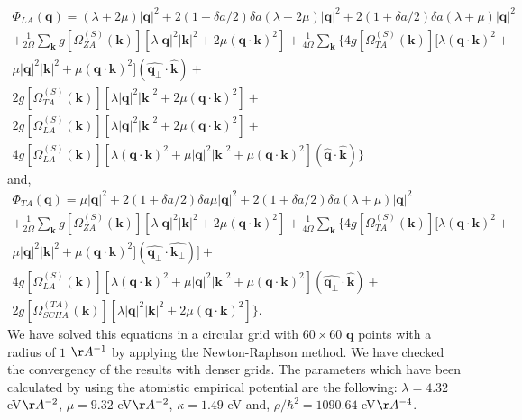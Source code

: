 \begin{multline}
 \Phi_{LA}(\boldsymbol{q})=(\lambda+2\mu)|\boldsymbol{q}|^{2}+2(1+\delta a/2)\delta a(\lambda+2\mu)|\boldsymbol{q}|^{2}+2(1+\delta a/2)\delta a(\lambda+\mu)|\boldsymbol{q}|^{2}\\+\frac{1}{2\Omega}\sum_{\boldsymbol{k}}g[\Omega_{ZA}^{(S)}(\boldsymbol{k})][\lambda|\boldsymbol{q}|^{2}|\boldsymbol{k}|^{2}+2\mu(\boldsymbol{q}\cdot\boldsymbol{k})^{2}]+\frac{1}{4\Omega}\sum_{\boldsymbol{k}}\{4g[\Omega_{TA}^{(S)}(\boldsymbol{k})][\lambda(\boldsymbol{q}\cdot\boldsymbol{
 k})^{2}+\\\mu|\boldsymbol{q}|^{2}|\boldsymbol{k}|^{2}+\mu(\boldsymbol{q}\cdot\boldsymbol{k})^{2}](\hat{\boldsymbol{q}_{\perp}}\cdot\hat{\boldsymbol{k}})+ \\ 2g[\Omega_{TA}^{(S)}(\boldsymbol{k})][\lambda|\boldsymbol{q}|^{2}|\boldsymbol{
 k}|^{2}+2\mu(\boldsymbol{q}\cdot\boldsymbol{k})^{2}]+ \\ 2g[\Omega_{LA}^{(S)}(\boldsymbol{k})][\lambda|\boldsymbol{q}|^{2}|\boldsymbol{k}|^{2}+2\mu(\boldsymbol{q}\cdot\boldsymbol{k})^{2}]+ \\ 4g[\Omega_{LA}^{(S)}(\boldsymbol{
 k})][\lambda(\boldsymbol{q}\cdot\boldsymbol{k})^{2}+\mu|\boldsymbol{q}|^{2}|\boldsymbol{k}|^{2}+\mu(\boldsymbol{q}\cdot\boldsymbol{k})^{2}](\hat{\boldsymbol{q}}\cdot\hat{\boldsymbol{k}})\}
\end{multline}
and,
\begin{multline}
 \Phi_{TA}(\boldsymbol{q})=\mu|\boldsymbol{q}|^{2}+2(1+\delta a/2)\delta a\mu|\boldsymbol{q}|^{2}+2(1+\delta a/2)\delta a(\lambda+\mu)|\boldsymbol{q}|^{2}\\+\frac{1}{2\Omega}\sum_{\boldsymbol{k}}g[\Omega_{ZA}^{(S)}(\boldsymbol{k})][\lambda|\boldsymbol{q}|^{2}|\boldsymbol{k}|^{2}+2\mu(\boldsymbol{q}\cdot\boldsymbol{k})^{2}]+\frac{1}{4\Omega}\sum_{\boldsymbol{k}}\{
 4g[\Omega_{TA}^{(S)}(\boldsymbol{k})][\lambda(\boldsymbol{q}\cdot\boldsymbol{k})^{2}+\\\mu|\boldsymbol{q}|^{2}|\boldsymbol{k}|^{2}+\mu(\boldsymbol{q}\cdot\boldsymbol{k})^{2}](\hat{\boldsymbol{q}_{\perp}}\cdot\hat{
 \boldsymbol{k}_{\perp}})]+\\4g[\Omega_{LA}^{(S)}(\boldsymbol{k})][\lambda(\boldsymbol{q}\cdot\boldsymbol{k})^{2}+\mu|\boldsymbol{q}|^{2}|\boldsymbol{k}|^{2}+\mu(\boldsymbol{q}\cdot\boldsymbol{k})^{2}](\hat{\boldsymbol{
 q}_{\perp}}\cdot\hat{\boldsymbol{k}})+ \\ 2g[\Omega_{SCHA}^{(TA)}(\boldsymbol{k})][\lambda|\boldsymbol{q}|^{2}|\boldsymbol{k}|^{2}+2\mu(\boldsymbol{q}\cdot\boldsymbol{k})^{2}]  \}.
\end{multline}
We have solved this equations in a circular grid with $60\times60$ $\boldsymbol{q}$ points with a radius of $1$ 
$\AA^{-1}$ by applying the Newton-Raphson method. We have checked the convergency of the results with denser grids. 
The parameters which have been calculated by using the atomistic empirical potential are the following: 
$\lambda=4.32$ eV$\AA^{-2}$, $\mu=9.32$ eV$\AA^{-2}$, $\kappa=1.49$ eV and, $\rho/\hbar^{2}=1090.64$ eV$\AA^{-4}$. \\

